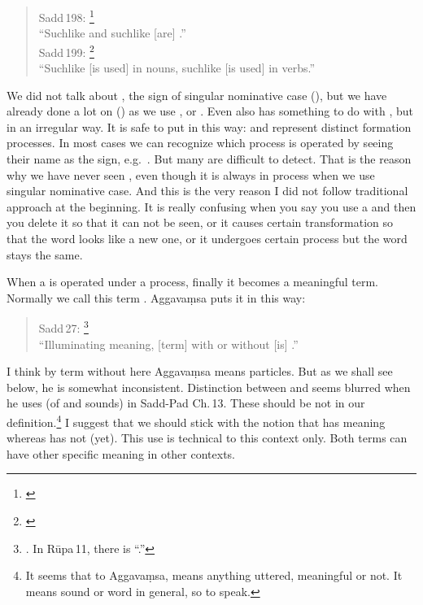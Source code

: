 \begin{quote}
Sadd\,198: \footnote{\citealp[p.~641]{smith:sadd3}}\\
``Suchlike  and suchlike  [are] .''\\[1.5mm]
Sadd\,199: \footnote{\citealp[p.~642]{smith:sadd3}}\\
``Suchlike  [is used] in nouns, suchlike  [is used] in verbs.''
\end{quote}

We did not talk about , the sign of singular nominative case (), but we have already done a lot on  () as we use , or . Even  also has something to do with , but in an irregular way. It is safe to put in this way:  and  represent distinct formation processes. In most cases we can recognize which process is operated by seeing their name as the sign, e.g.\ . But many are difficult to detect. That is the reason why we have never seen , even though it is always in process when we use singular nominative case. And this is the very reason I did not follow traditional approach at the beginning. It is really confusing when you say you use a  and then you delete it so that it can not be seen, or it causes certain transformation so that the word looks like a new one, or it undergoes certain process but the word stays the same.

When a  is operated under a  process, finally it becomes a meaningful term. Normally we call this term . Aggava\d msa puts it in this way:

\begin{quote}
Sadd\,27: \footnote{\citealp[p.~610]{smith:sadd3}. In R\=upa\,11, there is ``.''}\\
``Illuminating meaning, [term] with  or without  [is] .'' 
\end{quote}

I think by term without  here Aggava\d msa means particles. But as we shall see below, he is somewhat inconsistent. Distinction between  and  seems blurred when he uses  (of  and  sounds) in Sadd-Pad Ch.\,13. These should be  not  in our definition.\footnote{It seems that to Aggava\d msa,  means anything uttered, meaningful or not. It means sound or word in general, so to speak.} I suggest that we should stick with the notion that  has meaning whereas  has not (yet). This use is technical to this context only. Both terms can have other specific meaning in other contexts.

